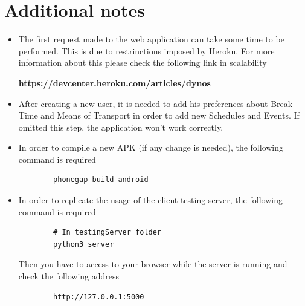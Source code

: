 \documentclass[numbers=noenddot, 12pt, a4paper, oneside]{scrbook}
\begin{document}
\section*{Additional notes}

\begin{itemize}
	\item The first request made to the web application can take some time to be performed. This is due to restrinctions imposed by Heroku.
	For more information about this please check the following link in scalability
	
	\textbf{https://devcenter.heroku.com/articles/dynos}
	
	\item After creating a new user, it is needed to add his preferences about Break Time and Means of Transport in order to add new Schedules and Events. If omitted this step, the application won't work correctly.
	
	\item In order to compile a new APK (if any change is needed), the following command is required
	\begin{lstlisting}
		phonegap build android
	\end{lstlisting}
	
	\item In order to replicate the usage of the client testing server, the following command is required
	\begin{lstlisting}
		# In testingServer folder
		python3 server
	\end{lstlisting}
	Then you have to access to your browser while the server is running and check the following address
	\begin{lstlisting}
		http://127.0.0.1:5000
	\end{lstlisting}
\end{itemize}
\end{document}
